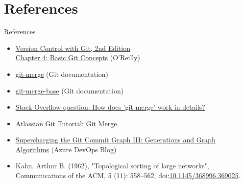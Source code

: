 \documentclass{beamer}
\begin{document}
\section{References}

\begin{frame}{References}
  \begin{itemize}
    \item \href{https://www.oreilly.com/library/view/version-control-with/9781449345037/ch04.html}{Version Control with Git, 2nd Edition\\Chapter 4: Basic Git Concepts} (O'Reilly)
    \item \href{https://git-scm.com/docs/git-merge}{git-merge} (Git documentation)
    \item \href{https://git-scm.com/docs/git-merge-base}{git-merge-base} (Git documentation)
    \item \href{https://stackoverflow.com/questions/14961255/how-does-git-merge-work-in-details}{Stack Overflow question: How does 'git merge' work in details?}
    \item \href{https://www.atlassian.com/git/tutorials/using-branches/git-merge}{Atlassian Git Tutorial: Git Merge}
    \item \href{https://devblogs.microsoft.com/devops/supercharging-the-git-commit-graph-iii-generations/}{Supercharging the Git Commit Graph III: Generations and Graph Algorithms} (Azure DevOps Blog)
    \item Kahn, Arthur B. (1962), "Topological sorting of large networks", Communications of the ACM, 5 (11): 558–562, doi:\href{https://doi.org/10.1145\%2F368996.369025}{10.1145/368996.369025}.
  \end{itemize}
\end{frame}
\end{document}
